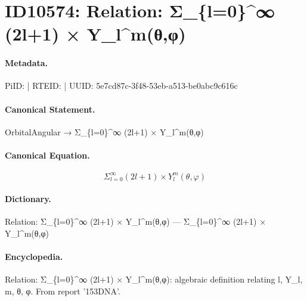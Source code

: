 \section*{ID10574: Relation: Σ\_\{l=0\}\textasciicircum{}∞ (2l+1) × Y\_l\textasciicircum{}m(θ,φ)}
\paragraph{Metadata.}
PiID:  | RTEID:  | UUID: 5e7cd87c-3f48-53eb-a513-be0abc9c616c

\paragraph{Canonical Statement.}
OrbitalAngular → Σ\_\{l=0\}\textasciicircum{}∞ (2l+1) × Y\_l\textasciicircum{}m(θ,φ)

\paragraph{Canonical Equation.}
\[
Σ_{l=0}^∞ (2l+1) × Y_l^m(θ,φ)
\]

\paragraph{Dictionary.}
Relation: Σ\_\{l=0\}\textasciicircum{}∞ (2l+1) × Y\_l\textasciicircum{}m(θ,φ) — Σ\_\{l=0\}\textasciicircum{}∞ (2l+1) × Y\_l\textasciicircum{}m(θ,φ)

\paragraph{Encyclopedia.}
Relation: Σ\_\{l=0\}\textasciicircum{}∞ (2l+1) × Y\_l\textasciicircum{}m(θ,φ): algebraic definition relating l, Y\_l, m, θ, φ. From report '153DNA'.
